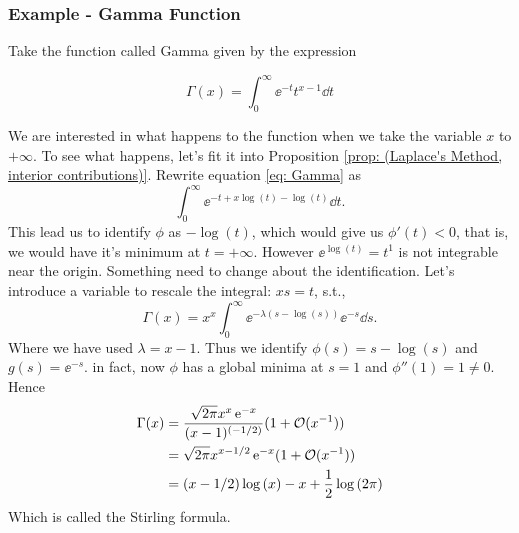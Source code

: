 \subsubsection{Example - Gamma Function}

Take the function called Gamma given by the expression

\begin{equation}
	\Gamma(x) = \int_{0}^{\infty} \ee^{-t} t^{x-1} \dd t
	\label{eq: Gamma}
\end{equation}

We are interested in what happens to the function when we take the variable $x$ to $+\infty$. To see what happens, let's fit it into Proposition \ref{prop: (Laplace's Method, interior contributions)}. Rewrite equation \ref{eq: Gamma} as
$$\int_{0}^{\infty} \ee^{-t+x\log{(t)}-\log{(t)}} \dd t.$$ 
This lead us to identify $\phi$ as $-\log{(t)}$, which would give us $\phi'(t) < 0$, that is, we would have it's minimum at $t=+\infty$. However $\ee^{\log{(t)}} = t^1$ is not integrable near the origin. Something need to change about the identification. Let's introduce a variable to rescale the integral: $xs = t$, s.t.,
$$\Gamma(x) = x^x \int_{0}^{\infty} \ee^{-\lambda(s - \log{(s)})} \ee^{-s} \dd s.$$
Where we have used $\lambda = x - 1$. Thus we identify $\phi(s) = s - \log(s)$ and $g(s) = \ee^{-s}$. in fact, now $\phi$ has a global minima at $s = 1$ and $\phi''(1) = 1 \neq 0$. Hence
\begin{equation*}
	\begin{split}
		\Gamma(x) & = \frac{\sqrt{2\pi} x^x \operatorname{e}^{-x}}{(x-1)^{(-1/2)}} (1 + \mathcal{O}(x^{-1})) \\
		& = \sqrt{2\pi} x^{x - 1/2} \operatorname{e}^{-x} (1 + \mathcal{O}(x^{-1})) \\
		& = (x-1/2)\log{(x)} - x + \frac{1}{2} \log{(2\pi)}
	\end{split}
\end{equation*} 
Which is called the Stirling formula.